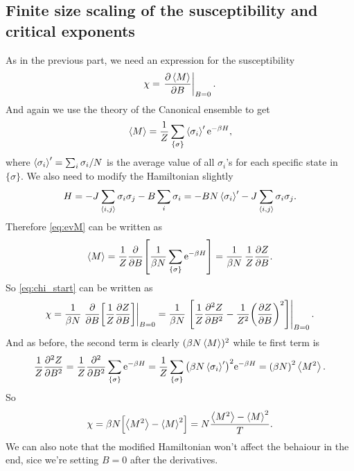 \documentclass[11pt,letter, swedish, english
]{article}
\begin{document}
\subsection{Finite size scaling of the susceptibility and critical exponents}
As in the previous part, we need an expression for the susceptibility
\begin{equation}\label{eq:chi_start}
\chi = \eval{\pdv{\ev{M}}{B}}_{B=0}.
\end{equation}
And again we use the theory of the Canonical ensemble to get
\begin{equation}\label{eq:evM}
\ev{M} = \frac{1}{Z}\sum_{\{\sigma\}} \ev{\sigma_i}'\ee^{-\beta H},
\end{equation}
where $\ev{\sigma_i}' = \sum_i\sigma_i/N$ is the
average\footnotemark{} value of all $\sigma_i$'s for each specific
state in $\{\sigma\}$. We also need to modify the Hamiltonian slightly 
\begin{equation}
H = -J\sum_{\ev{i, j}} \sigma_i\sigma_j
-B\sum_{i} \sigma_i
=-BN\ev{\sigma_i}' -J\sum_{\ev{i, j}} \sigma_i\sigma_j.
\end{equation}
Therefore \eqref{eq:evM} can be written as
\begin{equation}
\ev{M} = \frac{1}{Z} 
\pdv{B}\qty[\frac{1}{\beta N}\sum_{\{\sigma\}}\ee^{-\beta H}]
=\frac{1}{\beta N}\,\frac{1}{Z}\pdv{Z}{B}.
\end{equation}
So \eqref{eq:chi_start} can be written as
\begin{equation}
\chi = \frac{1}{\beta N} 
\eval{\pdv{B}\qty[\frac{1}{Z}\pdv{Z}{B}]}_{B=0}
=\frac{1}{\beta N} 
\eval{\qty[\frac{1}{Z}\pdv[2]{Z}{B}
-\frac{1}{Z^2}\qty(\pdv{Z}{B})^2]}_{B=0}.
\end{equation}
And as before, the second term is clearly $(\beta N\ev{M})^2$ while te
first term is
\begin{equation}
\frac{1}{Z}\pdv[2]{Z}{B}
=\frac{1}{Z}\pdv[2]{B}\sum_{\{\sigma\}}\ee^{-\beta H}
=\frac{1}{Z}\sum_{\{\sigma\}}
\qty(\beta N\ev{\sigma_i}')^2\ee^{-\beta H}
=\qty(\beta N)^2\ev{M^2}.
\end{equation}
So
\begin{equation}\label{eq:chi}
\chi =\beta N \qty[\ev{M^2} - \ev{M}^2]
=N \frac{\ev{M^2} - \ev{M}^2}{T}.
\end{equation}
We can also note that the modified Hamiltonian won't affect the
behaiour in the end, sice we're setting $B=0$ after the derivatives.
\end{document}
